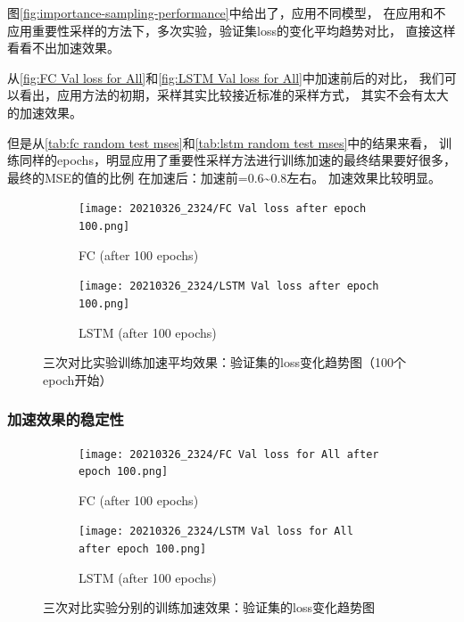   图\ref{fig:importance-sampling-performance}中给出了，应用不同模型，
  在应用和不应用重要性采样的方法下，多次实验，验证集loss的变化平均趋势对比，
  直接这样看看不出加速效果。

  从\ref{fig:FC Val loss for All}和\ref{fig:LSTM Val loss for All}中加速前后的对比，
  我们可以看出，应用方法的初期，采样其实比较接近标准的采样方式，
  其实不会有太大的加速效果。

  但是从\ref{tab:fc random test mses}和\ref{tab:lstm random test mses}中的结果来看，
  训练同样的epochs，明显应用了重要性采样方法进行训练加速的最终结果要好很多，最终的MSE的值的比例
  在加速后：加速前=0.6\textasciitilde 0.8左右。
  加速效果比较明显。

  \begin{figure}
    \begin{subfigure}[b]{0.45\textwidth}
        \centering
        \texttt{[image: 20210326\_2324/FC Val loss after epoch 100.png]}
        \caption{FC (after 100 epochs)}
        \label{fig:FC Val loss after epoch 100}
    \end{subfigure}
    \hfill
    \begin{subfigure}[b]{0.45\textwidth}
        \centering
        \texttt{[image: 20210326\_2324/LSTM Val loss after epoch 100.png]}
        \caption{LSTM (after 100 epochs)}
        \label{fig:LSTM Val loss after epoch 100}
    \end{subfigure}
      \caption{三次对比实验训练加速平均效果：验证集的loss变化趋势图（100个epoch开始）}
      \label{fig:importance-sampling-performance-after-100}
  \end{figure}

  \subsubsection{加速效果的稳定性}
  \begin{figure}
    \centering
    \begin{subfigure}[b]{0.45\textwidth}
        \centering
        \texttt{[image: 20210326\_2324/FC Val loss for All after epoch 100.png]}
        \caption{FC (after 100 epochs)}
        \label{fig:FC Val loss for All after epoch 100}
    \end{subfigure}
    \hfill
    \begin{subfigure}[b]{0.45\textwidth}
        \centering
        \texttt{[image: 20210326\_2324/LSTM Val loss for All after epoch 100.png]}
        \caption{LSTM (after 100 epochs)}
        \label{fig:LSTM Val loss for All after epoch 100}
    \end{subfigure}
      \caption{三次对比实验分别的训练加速效果：验证集的loss变化趋势图}
      \label{fig:importance-sampling-performance-All}
  \end{figure}

